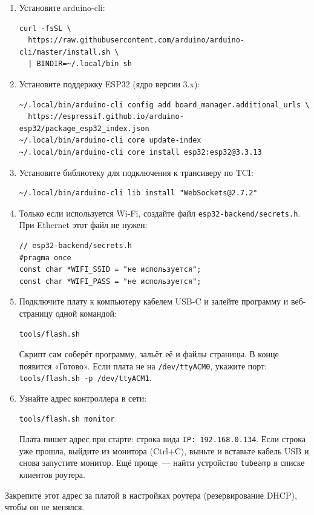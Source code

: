 \documentclass[a4paper,11pt]{article}
\begin{document}
\begin{enumerate}
  \item Установите arduino-cli:
\begin{verbatim}
curl -fsSL \
  https://raw.githubusercontent.com/arduino/arduino-cli/master/install.sh \
  | BINDIR=~/.local/bin sh
\end{verbatim}
  \item Установите поддержку ESP32 (ядро версии 3.x):
\begin{verbatim}
~/.local/bin/arduino-cli config add board_manager.additional_urls \
  https://espressif.github.io/arduino-esp32/package_esp32_index.json
~/.local/bin/arduino-cli core update-index
~/.local/bin/arduino-cli core install esp32:esp32@3.3.13
\end{verbatim}
  \item Установите библиотеку для подключения к трансиверу по TCI:
\begin{verbatim}
~/.local/bin/arduino-cli lib install "WebSockets@2.7.2"
\end{verbatim}
  \item Только если используется Wi-Fi, создайте файл \texttt{esp32-backend/secrets.h}.
        При Ethernet этот файл не нужен:
\begin{verbatim}
// esp32-backend/secrets.h
#pragma once
const char *WIFI_SSID = "не используется";
const char *WIFI_PASS = "не используется";
\end{verbatim}
  \item Подключите плату к компьютеру кабелем USB-C и залейте программу и веб-страницу одной командой:
\begin{verbatim}
tools/flash.sh
\end{verbatim}
        Скрипт сам соберёт программу, зальёт её и файлы страницы. В конце появится «Готово».
        Если плата не на \texttt{/dev/ttyACM0}, укажите порт: \texttt{tools/flash.sh -p /dev/ttyACM1}.
  \item Узнайте адрес контроллера в сети:
\begin{verbatim}
tools/flash.sh monitor
\end{verbatim}
        Плата пишет адрес при старте: строка вида \texttt{IP: 192.168.0.134}. Если строка уже прошла,
        выйдите из монитора (Ctrl+C), выньте и вставьте кабель USB и снова запустите монитор.
        Ещё проще~— найти устройство \texttt{tubeamp} в списке клиентов роутера.
\end{enumerate}

\begin{hint}
Закрепите этот адрес за платой в настройках роутера (резервирование DHCP), чтобы он не менялся.
\end{hint}
\end{document}
